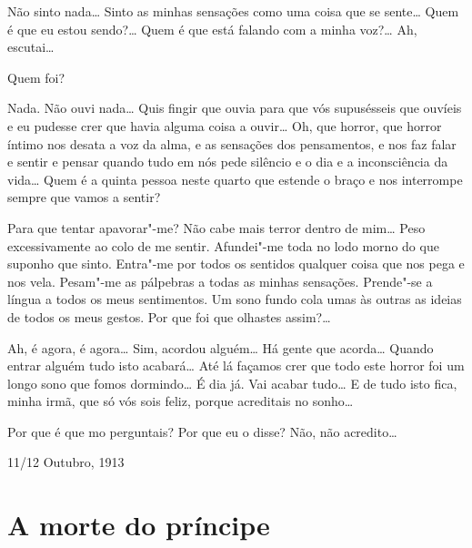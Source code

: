  Não sinto nada\ldots{} Sinto as
minhas sensações como uma coisa que
se sente\ldots{} Quem é que eu estou sendo?\ldots{} 
Quem é que está falando com a minha voz?\ldots{} 
Ah, escutai\ldots{}

 Quem foi?

 Nada. Não ouvi nada\ldots{} 
Quis fingir que ouvia para que vós
supusésseis que ouvíeis e eu pudesse crer 
que havia alguma coisa a ouvir\ldots{} 
Oh, que horror, que horror íntimo nos desata 
a voz da alma, e as sensações dos pensamentos, 
e nos faz falar e sentir e pensar quando
tudo em nós pede silêncio e o dia e a 
inconsciência da vida\ldots{} Quem é a
quinta pessoa neste quarto que estende o braço 
e nos interrompe sempre que vamos a sentir?

 Para que tentar apavorar"-me? 
Não cabe mais terror dentro de
mim\ldots{} 
Peso excessivamente ao colo de
me sentir. 
Afundei"-me toda no
lodo morno do que suponho que sinto. 
Entra"-me por todos os sentidos
qualquer coisa que nos pega e nos vela. 
Pesam"-me as pálpebras a todas as
minhas sensações. Prende"-se a língua a 
todos os meus sentimentos. Um
sono fundo cola umas às outras as ideias de 
todos os meus gestos. Por que foi que olhastes assim?\ldots{}

 
Ah, é agora, é agora\ldots{} Sim, acordou alguém\ldots{} 
Há gente que acorda\ldots{} Quando entrar
alguém tudo isto acabará\ldots{} Até lá façamos
crer que todo este horror
foi um longo sono que fomos dormindo\ldots{} 
É dia já. Vai acabar tudo\ldots{} E
de tudo isto fica, minha irmã, que só vós sois 
feliz, porque acreditais no sonho\ldots{}

 Por que é que mo perguntais? 
Por que eu o disse? Não, não acredito\ldots{}


\hfill 11/12 Outubro, 1913


\chapter{A morte do príncipe}

